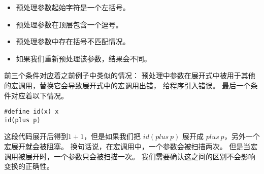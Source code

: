 \begin{itemize}
\item 预处理参数起始字符是一个左括号。
\item 预处理参数在顶层包含一个逗号。
\item 预处理参数中存在括号不匹配情况。
\item 如果我们重新预处理该参数，结果会不同。
\end{itemize}
前三个条件对应着之前例子中类似的情况：
预处理中参数在展开式中被用于其他的宏调用，替换它会导致展开式中的宏调用出错，
给程序引入错误。
最后一个条件对应着以下情况。
\begin{lstlisting}
#define id(x) x
id(plus p)
\end{lstlisting}
这段代码展开后得到$1+1$，但是如果我们把 $id(plus\ p)$
展开成  $plus\ p$，另外一个宏展开就会被阻塞。
换句话说，在宏调用中，一个参数会被扫描两次。
但是当宏调用被展开时，一个参数只会被扫描一次。
我们需要确认这之间的区别不会影响变换的正确性。


